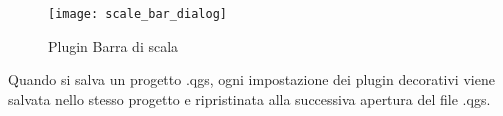 \begin{figure}[ht]
   \centering
   \texttt{[image: scale\_bar\_dialog]}
   \caption{Plugin Barra di scala \wincaption}\label{fig:scale_bar}
\end{figure}

\begin{Tip}\caption{\textsc{Impostazioni dei plugin salvate nel progetto}}
Quando si salva un progetto .qgs, ogni impostazione dei plugin decorativi viene salvata nello stesso 
progetto e ripristinata alla successiva apertura del file .qgs.
\end{Tip}

\FloatBarrier
